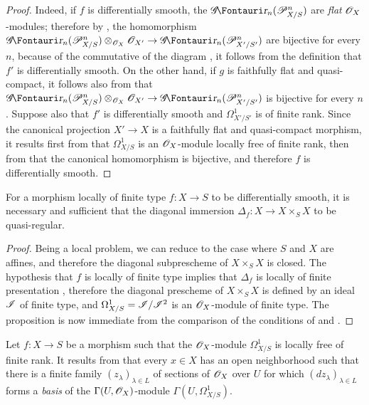 \begin{proof}
Indeed, if $f$ is differentially smooth, the $\shGr_n(\sh{P}_{X/S}^n)$ are \emph{flat} $\mathscr{O}_X$-modules;
therefore by , the homomorphism $\shGr_n(\sh{P}_{X/S}^n) \otimes_{\sh{O}_X} \sh{O}_{X'} \to \shGr_n(\sh{P}_{X'/S'}^n)$ are bijective for every $n$, because of the commutative of the diagram , it follows from the definition  that $f'$ is differentially smooth.
On the other hand, if $g$ is faithfully flat and quasi-compact, it follows also from  that $\shGr_n(\sh{P}_{X/S}^n) \otimes_{\sh{O}_X} \sh{O}_{X'} \to \shGr_n(\sh{P}_{X'/S'}^n)$ is bijective for every $n$.
Suppose also that $f'$ is differentially smooth and $\Omega_{X'/S'}^1$ is of finite rank.
Since the canonical projection $X' \to X$ is a faithfully flat and quasi-compact morphism, it results first from  that $\Omega_{X/S}^1$ is an $\mathscr{O}_X$-module locally free of finite rank, then from  that the canonical homomorphism  is bijective, and therefore $f$ is differentially smooth.
\end{proof}

\begin{proposition}[16.10.5]
\label{IV.16.10.5}
For a morphism locally of finite type $f:X \to S$ to be differentially smooth, it is necessary and sufficient that the diagonal immersion $\Delta_f:X \to X \times_S X$ to be quasi-regular.
\end{proposition}


\begin{proof}
Being a local problem, we can reduce to the case where $S$ and $X$ are affines, and therefore the diagonal subprescheme of $X \times_S X$ is closed.
The hypothesis that $f$ is locally of finite type implies that $\Delta_f$ is locally of finite presentation , therefore the diagonal prescheme of $X \times_S X$ is defined by an ideal $\mathscr{I}$ of finite type, and $\Omega_{X/S}^1 = \mathscr{I}/\mathscr{I}^2$ is an $\mathscr{O}_X$-module of finite type.
The proposition is now immediate from the comparison of the conditions of  and . 
\end{proof}

\begin{remark}[16.10.6]
\label{IV.16.10.6}
Let $f:X \to S$ be a morphism such that the $\mathscr{O}_X$-module $\Omega_{X/S}^1$ is locally free of finite rank.
It results from  that every $x \in X$ has an open neighborhood such that there is a finite family $(z_\lambda)_{\lambda \in L}$ of sections of $\mathscr{O}_X$ over $U$ for which $(dz_\lambda)_{\lambda \in L}$ forms a \emph{basis} of the $\Gamma(U, \mathscr{O}_X)$-module $\Gamma(U, \Omega_{X/S}^1)$.
\end{remark}